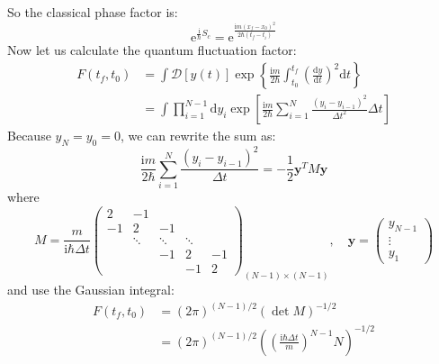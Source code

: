 \begin{example}
    So the classical phase factor is:
    \begin{equation}
    \mathrm{e}^{\frac{\mathrm{i}}{\hbar}S_c} = \mathrm{e}^{\frac{\mathrm{i}m(x_f - x_0)^2}{2\hbar(t_f - t_i)}}
    \end{equation}
    Now let us calculate the quantum fluctuation factor:
    \begin{equation}
    \begin{aligned}
    F(t_f, t_0) &= \int \mathcal{D}[y(t)] \exp\left\{\frac{\mathrm{i}m}{2\hbar} \int_{t_0}^{t_f} \left(\frac{\mathrm{d}y}{\mathrm{d}t}\right)^2 \mathrm{d}t\right\} \\
    &= \int \prod_{i=1}^{N-1} \mathrm{d}y_i \exp\left[\frac{\mathrm{i}m}{2\hbar} \sum_{i=1}^{N} \frac{(y_i - y_{i-1})^2}{\Delta t^2} \Delta t\right]
    \end{aligned}
    \end{equation}
    Because $y_N = y_0 = 0$, we can rewrite the sum as:
    \begin{equation}
    \frac{\mathrm{i}m}{2\hbar} \sum_{i=1}^{N} \frac{(y_i - y_{i-1})^2}{\Delta t} = -\frac{1}{2} \bm{y}^T M \bm{y}
    \end{equation}
    where
    \begin{equation}
    M = \frac{m}{\mathrm{i}\hbar\Delta t}
    \begin{pmatrix}
    2 & -1 & & \\
    -1 & 2 & -1 & \\
    & \ddots & \ddots & \ddots \\
    & & -1 & 2 & -1 \\
    & & & -1 & 2
    \end{pmatrix}_{(N-1)\times(N-1)},
    \quad
    \bm{y} =
    \begin{pmatrix}
    y_{N-1} \\
    \vdots \\
    y_1 
    \end{pmatrix}
    \end{equation}
    and use the Gaussian integral:
    \begin{equation}
    \begin{aligned}
    F(t_f, t_0) &= (2\pi)^{(N-1)/2} (\det M)^{-1/2} \\
    &= (2\pi)^{(N-1)/2} \left(\left(\frac{\mathrm{i}\hbar\Delta t}{m}\right)^{N-1} N \right)^{-1/2}
    \end{aligned}
    \end{equation}


\end{example}
